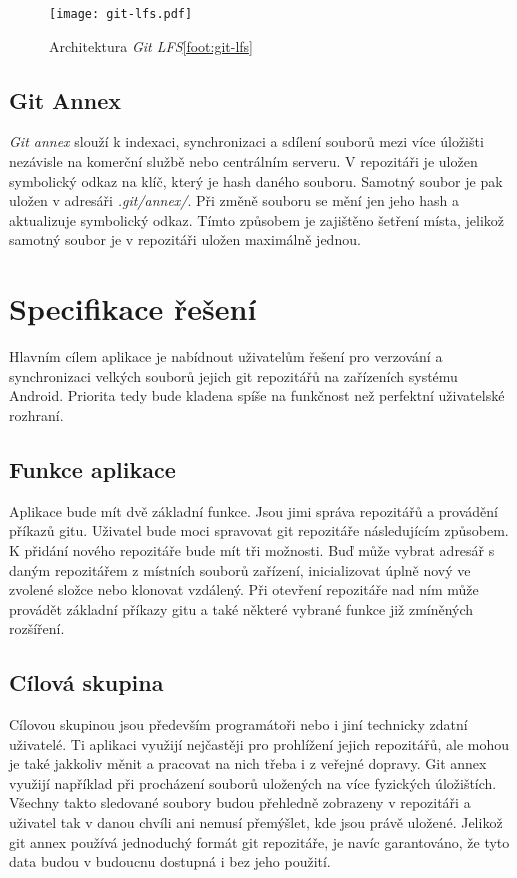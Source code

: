 \begin{figure}[h!]
    \begin{minipage}{\textwidth}
    \centering
    \vspace{0.5cm}
    \texttt{[image: git-lfs.pdf]}
    \caption{Architektura \emph{Git LFS}\ref{foot:git-lfs}}
    \label{diagram:git-lfs}
    \end{minipage}
\end{figure}

\section{Git Annex}
\emph{Git annex} slouží k indexaci, synchronizaci a sdílení souborů mezi více úložišti nezávisle na komerční službě nebo centrálním serveru\cite{wiki-git-annex}. V repozitáři je uložen symbolický odkaz na klíč, který je hash daného souboru. Samotný soubor je pak uložen v adresáři \emph{.git/annex/}. Při změně souboru se mění jen jeho hash a aktualizuje symbolický odkaz. Tímto způsobem je zajištěno šetření místa, jelikož samotný soubor je v repozitáři uložen maximálně jednou.

\chapter{Specifikace řešení}
Hlavním cílem aplikace je nabídnout uživatelům řešení pro verzování a synchronizaci velkých souborů jejich git repozitářů na zařízeních systému Android. Priorita tedy bude kladena spíše na funkčnost než perfektní uživatelské rozhraní.

\section{Funkce aplikace}
Aplikace bude mít dvě základní funkce. Jsou jimi správa repozitářů a provádění příkazů gitu. Uživatel bude moci spravovat git repozitáře následujícím způsobem. K přidání nového repozitáře bude mít tři možnosti. Buď může vybrat adresář s daným repozitářem z místních souborů zařízení, inicializovat úplně nový ve zvolené složce nebo klonovat vzdálený. Při otevření repozitáře nad ním může provádět základní příkazy gitu a také některé vybrané funkce již zmíněných rozšíření.

\section{Cílová skupina}
Cílovou skupinou jsou především programátoři nebo i jiní technicky zdatní uživatelé. Ti aplikaci využijí nejčastěji pro prohlížení jejich repozitářů, ale mohou je také jakkoliv měnit a pracovat na nich třeba i z veřejné dopravy. Git annex využijí například při procházení souborů uložených na více fyzických úložištích. Všechny takto sledované soubory budou přehledně zobrazeny v repozitáři a uživatel tak v danou chvíli ani nemusí přemýšlet, kde jsou právě uložené. Jelikož git annex používá jednoduchý formát git repozitáře, je navíc garantováno, že tyto data budou v budoucnu dostupná i bez jeho použití.

